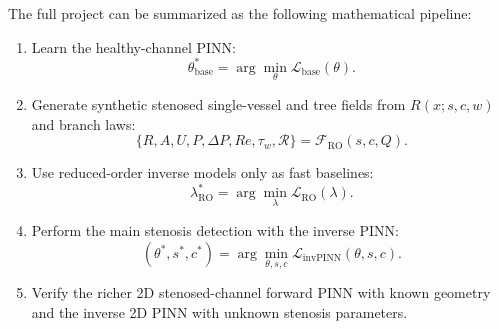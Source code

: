 \documentclass[11pt]{article}
\begin{document}
The full project can be summarized as the following mathematical pipeline:
\begin{enumerate}
    \item Learn the healthy-channel PINN:
    \begin{equation}
        \theta_{\mathrm{base}}^{\ast}
        =
        \arg\min_{\theta}
        \mathcal{L}_{\mathrm{base}}(\theta).
    \end{equation}
    \item Generate synthetic stenosed single-vessel and tree fields from $R(x;s,c,w)$ and branch laws:
    \begin{equation}
        \{R,A,U,P,\Delta P,Re,\tau_w,\mathcal{R}\}
        =
        \mathcal{F}_{\mathrm{RO}}(s,c,Q).
    \end{equation}
    \item Use reduced-order inverse models only as fast baselines:
    \begin{equation}
        \lambda_{\mathrm{RO}}^{\ast}
        =
        \arg\min_{\lambda}
        \mathcal{L}_{\mathrm{RO}}(\lambda).
    \end{equation}
    \item Perform the main stenosis detection with the inverse PINN:
    \begin{equation}
        (\theta^{\ast},s^{\ast},c^{\ast})
        =
        \arg\min_{\theta,s,c}
        \mathcal{L}_{\mathrm{invPINN}}(\theta,s,c).
    \end{equation}
    \item Verify the richer 2D stenosed-channel forward PINN with known geometry and the inverse 2D PINN with unknown stenosis parameters.
\end{enumerate}
\end{document}
